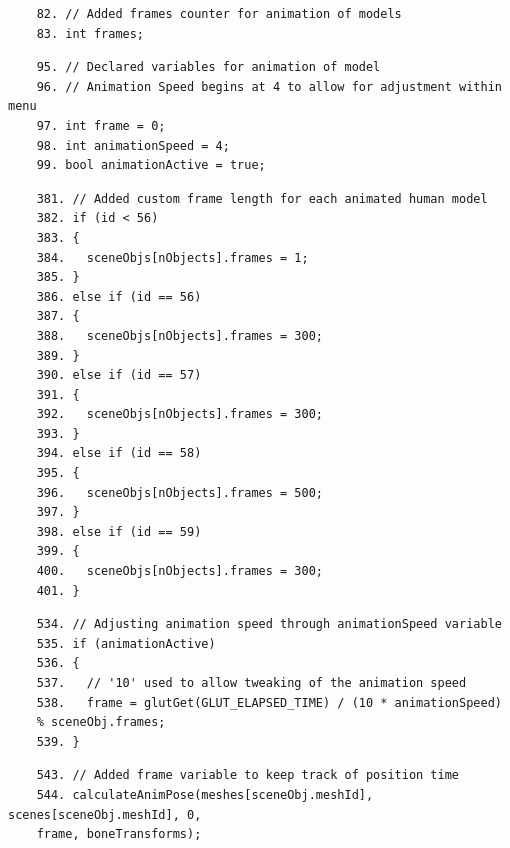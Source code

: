 \documentclass{article}
\begin{document}
\begin{commandline}
	\begin{verbatim}
	82. // Added frames counter for animation of models
	83. int frames;
	\end{verbatim}
\end{commandline}

\begin{commandline}
	\begin{verbatim}
	95. // Declared variables for animation of model
	96. // Animation Speed begins at 4 to allow for adjustment within menu
	97. int frame = 0;
	98. int animationSpeed = 4;
	99. bool animationActive = true;
	\end{verbatim}
\end{commandline}



\begin{commandline}
	\begin{verbatim}
	381. // Added custom frame length for each animated human model
	382. if (id < 56)
	383. {
	384.   sceneObjs[nObjects].frames = 1;
	385. }
	386. else if (id == 56)
	387. {
	388.   sceneObjs[nObjects].frames = 300;
	389. }
	390. else if (id == 57)
	391. {
	392.   sceneObjs[nObjects].frames = 300;
	393. }
	394. else if (id == 58)
	395. {
	396.   sceneObjs[nObjects].frames = 500;
	397. }
	398. else if (id == 59)
	399. {
	400.   sceneObjs[nObjects].frames = 300;
	401. }
	\end{verbatim}
\end{commandline}


\begin{commandline}
	\begin{verbatim}
	534. // Adjusting animation speed through animationSpeed variable
	535. if (animationActive)
	536. {
	537.   // '10' used to allow tweaking of the animation speed
	538.   frame = glutGet(GLUT_ELAPSED_TIME) / (10 * animationSpeed) 
	% sceneObj.frames;
	539. }
	\end{verbatim}
\end{commandline}

\begin{commandline}
	\begin{verbatim}
	543. // Added frame variable to keep track of position time
	544. calculateAnimPose(meshes[sceneObj.meshId], scenes[sceneObj.meshId], 0,
	frame, boneTransforms);
	\end{verbatim}
\end{commandline}
\end{document}
